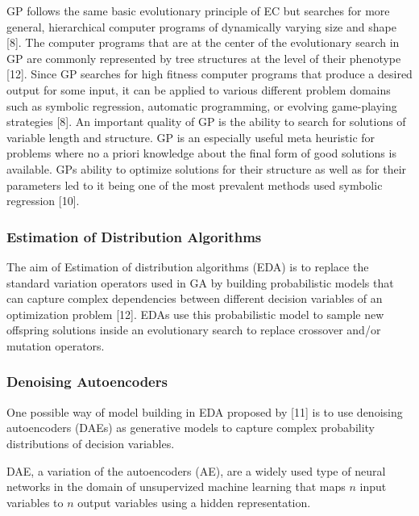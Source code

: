 \documentclass[
  11pt,
]{article}
\begin{document}
GP follows the same basic evolutionary principle of EC but searches for
more general, hierarchical computer programs of dynamically varying size
and shape {[}8{]}. The computer programs that are at the center of the
evolutionary search in GP are commonly represented by tree structures at
the level of their phenotype {[}12{]}. Since GP searches for high
fitness computer programs that produce a desired output for some input,
it can be applied to various different problem domains such as symbolic
regression, automatic programming, or evolving game-playing strategies
{[}8{]}. An important quality of GP is the ability to search for
solutions of variable length and structure. GP is an especially useful
meta heuristic for problems where no a priori knowledge about the final
form of good solutions is available. GPs ability to optimize solutions
for their structure as well as for their parameters led to it being one
of the most prevalent methods used symbolic regression {[}10{]}.

\hypertarget{estimation-of-distribution-algorithms}{%
\subsubsection{Estimation of Distribution
Algorithms}\label{estimation-of-distribution-algorithms}}

The aim of Estimation of distribution algorithms (EDA) is to replace the
standard variation operators used in GA by building probabilistic models
that can capture complex dependencies between different decision
variables of an optimization problem {[}12{]}. EDAs use this
probabilistic model to sample new offspring solutions inside an
evolutionary search to replace crossover and/or mutation operators.

\hypertarget{denoising-autoencoders}{%
\subsubsection{Denoising Autoencoders}\label{denoising-autoencoders}}

One possible way of model building in EDA proposed by {[}11{]} is to use
denoising autoencoders (DAEs) as generative models to capture complex
probability distributions of decision variables.

DAE, a variation of the autoencoders (AE), are a widely used type of
neural networks in the domain of unsupervized machine learning that maps
\(n\) input variables to \(n\) output variables using a hidden
representation.
\end{document}
